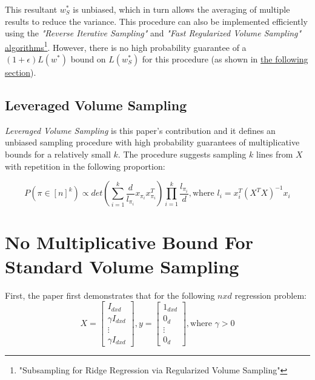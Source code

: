 \documentclass{article}
\begin{document}
            This resultant $w_{S}^\ast$ is unbiased, which in turn allows the averaging of multiple results to reduce the variance.
            This procedure can also be implemented efficiently using the \textit{"Reverse Iterative Sampling"} and \textit{"Fast Regularized
            Volume Sampling"} {\color{blue}\href{https://arxiv.org/abs/1710.05110}{\underline{algorithms}}}\footnote{\label{reg_vol_samp}"Subsampling
            for Ridge Regression via Regularized Volume Sampling"}.
            However, there is no high probability guarantee of a $(1+\epsilon)L(w^\ast)$ bound on $L(w_{S}^\ast)$ for this procedure
            (as shown in \hyperref[sec:no_mult_bound_vol]{the following section}).

        \subsection{Leveraged Volume Sampling}
            \textit{Leveraged Volume Sampling} is this paper's contribution and it defines an unbiased sampling procedure with high probability
            guarantees of multiplicative bounds for a relatively small $k$.
            The procedure suggests sampling $k$ lines from $X$ with repetition in the following proportion:

            \begin{equation}
                P(\pi\in{[n]^k})\propto{det(\sum_{i=1}^{k}\frac{d}{l_{\pi_{i}}}x_{\pi_{i}}x_{\pi_{i}}^T)\prod_{i=1}^{k}\frac{l_{\pi_{i}}}{d}}, \text{where } l_{i}=x_{i}^T(X^TX)^{-1}x_{i}
            \end{equation}

    \section{No Multiplicative Bound For Standard Volume Sampling}
    \label{sec:no_mult_bound_vol}
    First, the paper first demonstrates that for the following $n x d$ regression problem:
    \begin{equation*}
        X=
            \begin{bmatrix}
                I_{dxd} \\
                \gamma I_{dxd} \\
                \vdots \\
                \gamma I_{dxd}
            \end{bmatrix}
        , y=
            \begin{bmatrix}
                1_{dxd} \\
                0_{d} \\
                \vdots \\
                0_{d}
            \end{bmatrix}
        , \text{where } \gamma > 0
    \end{equation*}
\end{document}
